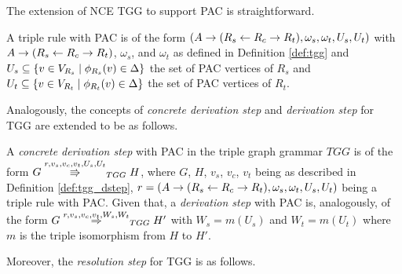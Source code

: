 \documentclass[]{report}
\begin{document}
The extension of NCE TGG to support PAC is straightforward. 

\begin{definition}
	A triple rule with PAC is of the form $(A \to (R_s \overset{}{\leftarrow} R_c \overset{}{\rightarrow} R_t), \omega_s, \omega_t, U_s, U_t)$ with $A \to (R_s \overset{}{\leftarrow} R_c \overset{}{\rightarrow} R_t)$, $\omega_s$, and $\omega_t$ as defined in Definition \ref{def:tgg} and $U_s \subseteq \{v \in V_{R_s} \; | \; \phi_{R_s}(v) \in \Delta\}$ the set of PAC vertices of $R_s$ and $U_t \subseteq \{v \in V_{R_t} \; | \; \phi_{R_t}(v) \in \Delta\}$ the set of PAC vertices of $R_t$.
\end{definition}

Analogously, the concepts of \textit{concrete derivation step} and \textit{derivation step} for TGG are extended to be as follows.

\begin{definition}
 A \textit{concrete derivation step} with PAC in the triple graph grammar $TGG$ is of the form $G \overset{r,v_s,v_c,v_t,U_s,U_t}{\Rrightarrow}_{TGG} H$, where $G$, $H$, $v_s$, $v_c$, $v_t$ being as described in Definition \ref{def:tgg_dstep}, $r = (A \to (R_s \overset{}{\leftarrow} R_c \overset{}{\rightarrow} R_t), \omega_s, \omega_t, U_s, U_t)$ being a triple rule with PAC. Given that, a \textit{derivation step} with PAC is, analogously, of the form $G \overset{r,v_s,v_c,v_t,W_s,W_t}{\Rightarrow}_{TGG} H'$ with $W_s = m(U_s)$ and $W_t = m(U_t)$ where $m$ is the triple isomorphism from $H$ to $H'$.
\end{definition}

Moreover, the \textit{resolution step} for TGG is as follows.
\end{document}

